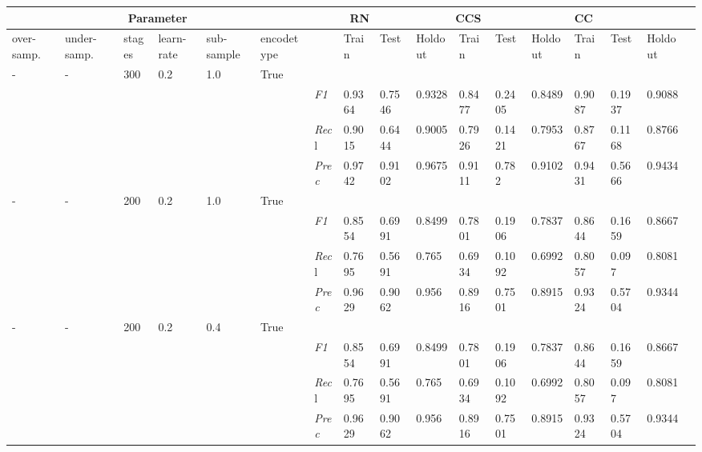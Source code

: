     \begin{table}[]
    \tiny
    \tabcolsep=0.11cm
    \begin{tabularx}{\textwidth}{XXXXXX|X|XXX|XXX|XXXX}
    \toprule
    \multicolumn{6}{c}{Parameter} & \multicolumn{3}{c}{RN} & \multicolumn{3}{c}{CCS} & \multicolumn{3}{c}{CC} \\ \midrule
    over-\newline samp. & under-\newline samp. & stages &learn-\newline rate & sub-\newline sample & encode\newline type & & Train &  Test & Holdout & Train &  Test & Holdout & Train &  Test & Holdout \\ \midrule
    - & - & 300 & 0.2 & 1.0 &True & & & & & & & & & \\
    & & & & & & \textit{F1} & 0.9364 & 0.7546 & 0.9328 & 0.8477 & 0.2405        & 0.8489        & 0.9087        & 0.1937        & 0.9088        \\
    & & & & & & \textit{Rec}l & 0.9015 & 0.6444 & 0.9005    & 0.7926 & 0.1421    & 0.7953    & 0.8767    & 0.1168    & 0.8766    \\
    & & & & & & \textit{Prec} & 0.9742 & 0.9102 & 0.9675 & 0.9111 & 0.782 & 0.9102 & 0.9431 & 0.5666 & 0.9434 \\ \midrule
    - & - & 200 & 0.2 & 1.0 &True & & & & & & & & & \\
    & & & & & & \textit{F1} & 0.8554 & 0.6991 & 0.8499 & 0.7801 & 0.1906        & 0.7837        & 0.8644        & 0.1659        & 0.8667        \\
    & & & & & & \textit{Rec}l & 0.7695 & 0.5691 & 0.765    & 0.6934 & 0.1092    & 0.6992    & 0.8057    & 0.097    & 0.8081    \\
    & & & & & & \textit{Prec} & 0.9629 & 0.9062 & 0.956 & 0.8916 & 0.7501 & 0.8915 & 0.9324 & 0.5704 & 0.9344 \\ \midrule
    - & - & 200 & 0.2 & 0.4 &True & & & & & & & & & \\
    & & & & & & \textit{F1} & 0.8554 & 0.6991 & 0.8499 & 0.7801 & 0.1906        & 0.7837        & 0.8644        & 0.1659        & 0.8667        \\
    & & & & & & \textit{Rec}l & 0.7695 & 0.5691 & 0.765    & 0.6934 & 0.1092    & 0.6992    & 0.8057    & 0.097    & 0.8081    \\
    & & & & & & \textit{Prec} & 0.9629 & 0.9062 & 0.956 & 0.8916 & 0.7501 & 0.8915 & 0.9324 & 0.5704 & 0.9344 \\ \midrule

\end{tabularx}
\end{table}

